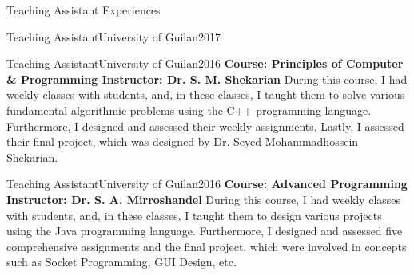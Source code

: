 \documentclass[]{mcdowellcv}
\begin{document}
\begin{cvsection}{Teaching Assistant Experiences}
\begin{cvsubsection}{Teaching Assistant}{University of Guilan}{2017}
    
    	\end{cvsubsection}
    	

    	
    	\begin{cvsubsection}{Teaching Assistant}{University of Guilan}{2016}
    	    \setlength{\columnsep}{-2.1in}
    	    \textbf{Course: Principles of Computer \& Programming \newline Instructor: Dr. S. M. Shekarian} \newline
        During this course, I had weekly classes with students, and, in these classes, I taught them to solve various fundamental algorithmic problems using the C++ programming language. Furthermore, I designed and assessed their weekly assignments. Lastly, I assessed their final project, which was designed by Dr. Seyed Mohammadhossein Shekarian.
    	\end{cvsubsection}
    	
    	\begin{cvsubsection}{Teaching Assistant}{University of Guilan}{2016}
    	    \setlength{\columnsep}{-2.1in}
    	    \textbf{Course: Advanced Programming \newline Instructor: Dr. S. A. Mirroshandel} \newline
        During this course, I had weekly classes with students, and, in these classes, I taught them to design various projects using the Java programming language. Furthermore, I designed and assessed five comprehensive assignments and the final project, which were involved in concepts such as Socket Programming, GUI Design, etc.
    	\end{cvsubsection}
    
    
    \end{cvsection}
    
    


        
\end{document}
